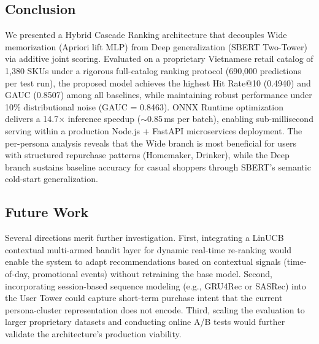 \documentclass[10pt,conference]{IEEEtran}
\begin{document}
\subsection{Conclusion}

We presented a Hybrid Cascade Ranking architecture that decouples Wide memorization (Apriori lift MLP) from Deep generalization (SBERT Two-Tower) via additive joint scoring. Evaluated on a proprietary Vietnamese retail catalog of 1,380 SKUs under a rigorous full-catalog ranking protocol (690,000 predictions per test run), the proposed model achieves the highest Hit Rate@10 (0.4940) and GAUC (0.8507) among all baselines, while maintaining robust performance under 10\% distributional noise (GAUC = 0.8463). ONNX Runtime optimization delivers a 14.7$\times$ inference speedup ($\sim$0.85\,ms per batch), enabling sub-millisecond serving within a production Node.js + FastAPI microservices deployment. The per-persona analysis reveals that the Wide branch is most beneficial for users with structured repurchase patterns (Homemaker, Drinker), while the Deep branch sustains baseline accuracy for casual shoppers through SBERT's semantic cold-start generalization.

\subsection{Future Work}

Several directions merit further investigation. First, integrating a LinUCB contextual multi-armed bandit layer for dynamic real-time re-ranking would enable the system to adapt recommendations based on contextual signals (time-of-day, promotional events) without retraining the base model. Second, incorporating session-based sequence modeling (e.g., GRU4Rec or SASRec) into the User Tower could capture short-term purchase intent that the current persona-cluster representation does not encode. Third, scaling the evaluation to larger proprietary datasets and conducting online A/B tests would further validate the architecture's production viability.

\clearpage


\end{document}
